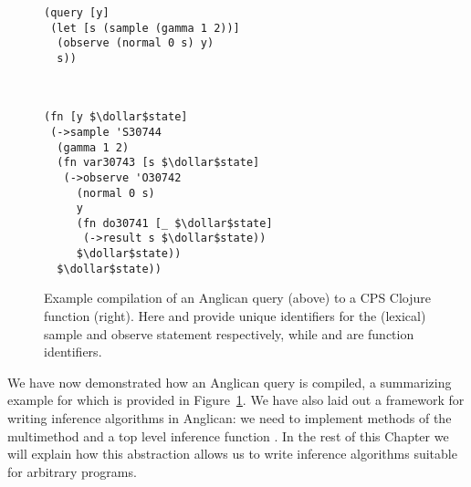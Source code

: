 \begin{figure}[t]
	\centering
	\begin{minipage}[t]{0.49\textwidth}
		\centering	
		\begin{lstlisting}[basicstyle=\ttfamily\footnotesize]
(query [y]
 (let [s (sample (gamma 1 2))]
  (observe (normal 0 s) y)
  s))
		\end{lstlisting}
		\vspace{-7pt}
\caption{Example compilation of an Anglican query (above) to a
	CPS Clojure function (right).
	Here  and  provide unique identifiers
	for the (lexical) sample and observe statement respectively, while
	 and  are function identifiers. 
				\label{fig:proginf:comp}}
	\end{minipage}
	~~
	\begin{minipage}[t]{0.47\textwidth}
		\centering	
		\begin{lstlisting}[basicstyle=\ttfamily\footnotesize]
(fn [y $\dollar$state]
 (->sample 'S30744
  (gamma 1 2) 
  (fn var30743 [s $\dollar$state] 
   (->observe 'O30742
     (normal 0 s) 
     y
     (fn do30741 [_ $\dollar$state] 
      (->result s $\dollar$state)) 
     $\dollar$state)) 
  $\dollar$state))
		\end{lstlisting}	
	\end{minipage}
\end{figure}

We have now demonstrated how an Anglican query is compiled, a summarizing example for which
is provided in Figure~\ref{fig:proginf:comp}.  We have also laid out a framework for
writing inference algorithms in Anglican: we need to implement methods of the \checkpoint multimethod
and a top level inference function \anginfer.  
In the rest of this Chapter we will
explain how this abstraction allows us to write inference algorithms suitable for arbitrary programs.